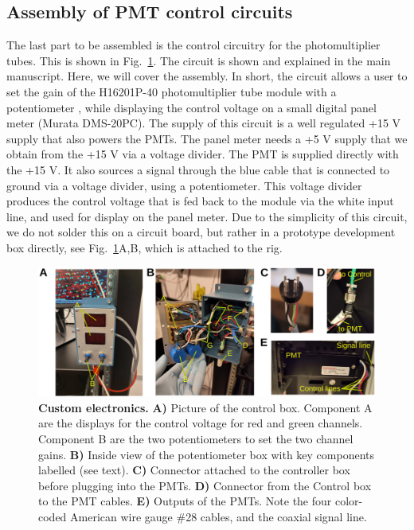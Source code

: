 \documentclass[10pt,letterpaper]{article}
\begin{document}
\subsection{Assembly of PMT control circuits}
The last part to be assembled is the control circuitry for the photomultiplier tubes. This is shown in Fig.~\ref{sfig12}. The circuit is shown and explained in the main manuscript. Here, we will cover the assembly. In short, the circuit allows a user to set the gain of the H16201P-40 photomultiplier tube module with a potentiometer \cite{Hamamatsu2024}, while displaying the control voltage on a small digital panel meter (Murata DMS-20PC). The supply of this circuit is a well regulated +15 V supply that also powers the PMTs. The panel meter needs a +5 V supply that we obtain from the +15 V via a voltage divider. The PMT is supplied directly with the +15 V. It also sources a signal through the blue cable that is connected to ground via a voltage divider, using a potentiometer. This voltage divider produces the control voltage that is fed back to the module via the white input line, and used for display on the panel meter. Due to the simplicity of this circuit, we do not solder this on a circuit board, but rather in a prototype development box directly, see Fig.~\ref{sfig12}A,B, which is attached to the rig.
%
\begin{figure}[t]
    \includegraphics[width=\textwidth]{sfig12.jpg}
  \caption{{\bf Custom electronics.} \textbf{A)} Picture of the control box. Component A are the displays for the control voltage for red and green channels. Component B are the two potentiometers to set the two channel gains. \textbf{B)} Inside view of the potentiometer box with key components labelled (see text). \textbf{C)} Connector attached to the controller box before plugging into the PMTs. \textbf{D)} Connector from the Control box to the PMT cables. \textbf{E)} Outputs of the PMTs. Note the four color-coded American wire gauge \#28 cables, and the coaxial signal line\cite{Hamamatsu2024}.}
  \label{sfig12}
\end{figure}
\end{document}
